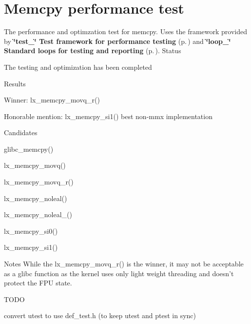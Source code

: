 \section{Memcpy performance test}
\label{group__memcpy__test}
The performance and optimzation test for memcpy. Uses the framework provided by {\bf \char`\"{}test\_\-\char`\"{} Test framework for performance testing} {\rm (p.\,\pageref{group__test})} and {\bf \char`\"{}loop\_\-\char`\"{} Standard loops for testing and reporting} {\rm (p.\,\pageref{group__loop__test})}. 
Status

The testing and optimization has been completed

Results

\begin{CompactItemize}
\item 
Winner: lx\_\-memcpy\_\-movq\_\-r()\item 
Honorable mention: lx\_\-memcpy\_\-si1() best non-mmx implementation\end{CompactItemize}
Candidates

\begin{CompactItemize}
\item 
glibc\_\-memcpy()\item 
lx\_\-memcpy\_\-movq()\item 
lx\_\-memcpy\_\-movq\_\-r()\item 
lx\_\-memcpy\_\-noleal()\item 
lx\_\-memcpy\_\-noleal\_()\item 
lx\_\-memcpy\_\-si0()\item 
lx\_\-memcpy\_\-si1()\end{CompactItemize}
Notes While the lx\_\-memcpy\_\-movq\_\-r() is the winner, it may not be acceptable as a glibc function as the kernel uses only light weight threading and doesn't protect the FPU state.

TODO\begin{CompactItemize}
\item 
convert utest to use def\_\-test.h (to keep utest and ptest in sync) \end{CompactItemize}
